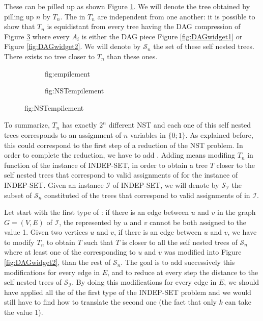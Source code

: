 These \widgets can be pilled up as shown Figure
\ref{fig:empilement}. We will denote the tree obtained by pilling up
$n$ \widgets by $T_{n}$. The \widgets in $T_{n}$ are independent from
one another: it is possible to show that $T_{n}$ is
equidistant from every tree having the DAG compression of Figure
\ref{fig:NSTempilement} where every $A_{i}$ is either the DAG piece
Figure \ref{fig:DAGwidget1} or Figure \ref{fig:DAGwidget2}. We will
denote by $\mathcal{S}_{n}$ the set of these self nested trees. There
exists no tree closer to $T_{n}$ than these ones. %

\begin{figure}
 \begin{subfigure}[b]{0.45\textwidth}
    \centering
    \caption{fig:empilement}
    \label{fig:empilement}
  \end{subfigure}
  \quad
  \begin{subfigure}[b]{0.45\textwidth}
    \centering
    \caption{fig:NSTempilement}
    \label{fig:NSTempilement}
  \end{subfigure} 
\end{figure}

To summarize, $T_{n}$ has exactly $2^{n}$ different NST and each one
of this self nested trees corresponds to an assignment of $n$
variables in $\{0;1\}$. As explained before, this could correspond to
the first step of a reduction of the NST problem. In order to complete
the reduction, we have to add \constraints. Adding \constraints means
modifing $T_{n}$ in function of the instance of INDEP-SET, in order to
obtain a tree $T$ closer to the self nested trees that correspond to valid
assignments of \variables for the instance of INDEP-SET. Given an
instance $\mathcal{I}$ of INDEP-SET, we will denote
by $\mathcal{S}_{\mathcal{I}}$ the subset of $\mathcal{S}_{n}$
constituted of the trees that correspond to valid assignments of
\variables in $\mathcal{I}$.
 
Let start with the first type of \constraint: if there is an edge
between $u$ and $v$ in the graph $G=(V,E)$ of $\mathcal{I}$, the
\variables represented by $u$ and $v$ cannot be both assigned to the
value 1. Given two vertices $u$ and $v$, if there is an edge between
$u$ and $v$, we have to modify $T_{n}$ to obtain $T$ such that $T$ is
closer to all the self nested trees of $\mathcal{S}_{n}$ where at
least one of the \widgets corresponding to $u$ and $v$ was modified
into Figure \ref{fig:DAGwidget2}, than the rest of
$\mathcal{S}_{n}$. The goal is to add successively this modifications
for every edge in $E$, and to reduce at every step the distance to the
self nested trees of $\mathcal{S}_{\mathcal{I}}$. By doing this
modifications for every edge in $E$, we should have applied all the
\constraints of the first type of the INDEP-SET problem and we would
still have to find how to translate the second one (the fact that only
$k$ \variables can take the value 1).

